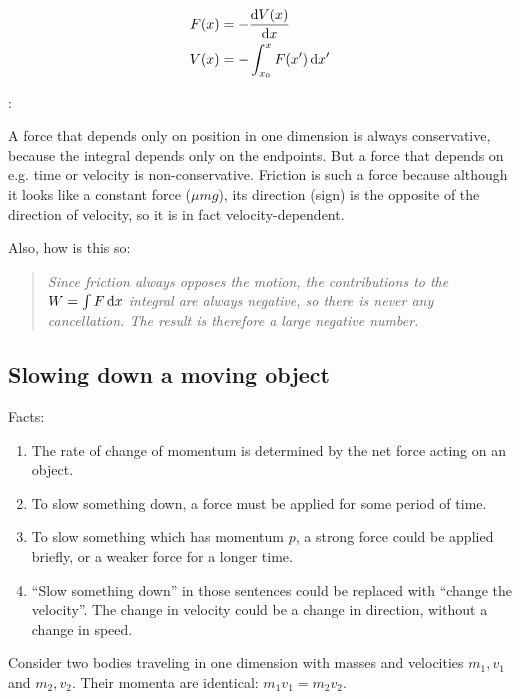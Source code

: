 
\begin{align*}
  F(x) &= -\frac{\d V(x)}{\dx} \\
  V(x) &= -\int_{x_0}^x F(x') \dx'
\end{align*}

:

A force that depends only on position in one dimension is always conservative, because the integral
depends only on the endpoints. But a force that depends on e.g. time or velocity is
non-conservative. Friction is such a force because although it looks like a constant force
($\mu mg$), its direction (sign) is the opposite of the direction of velocity, so it is in fact
velocity-dependent.

Also, how is this so:
\begin{quote}
  \emph{Since friction always opposes the motion, the contributions to the $W = \int F \dx$ integral are
    always negative, so there is never any cancellation. The result is therefore a large negative
    number.}
\end{quote}

\subsection{Slowing down a moving object}

Facts:

\begin{enumerate}
\item The rate of change of momentum is determined by the net force acting on an object.
\item To slow something down, a force must be applied for some period of time.
\item To slow something which has momentum $p$, a strong force could be applied briefly, or a weaker
  force for a longer time.
\item ``Slow something down'' in those sentences could be replaced with ``change the velocity''. The
  change in velocity could be a change in direction, without a change in speed.
\end{enumerate}


Consider two bodies traveling in one dimension with masses and velocities $m_1, v_1$ and $m_2,
v_2$. Their momenta are identical: $m_1v_1 = m_2v_2$.

